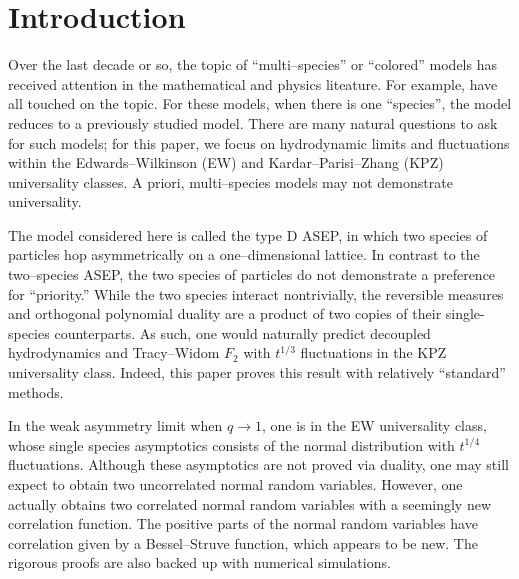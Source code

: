 \documentclass[11pt]{article}
\theoremstyle{plain}
\theoremstyle{definition}
\theoremstyle{remark}
\begin{document}
{\small\tableofcontents}

\section{Introduction}\label{sec:intro}

Over the last decade or so, the topic of ``multi--species'' or ``colored'' models has received attention in the mathematical and physics liteature. For example,    \cite{Spohn14, FSS, PSSS, SpohnStoltz, PSS, MendlSpohn, vanBeijeren, DDSMS, SpohnReview, FunakiHoshino, KupiainenMarcozzi, ButelmannMF,
  CdGHSU, NejjarMixing, FerrariNejjar, NejjarHard, ACH, BalazsSeppalainen, FerrariMartin, ANP, BorodinWheeler, AggarwalBorodin, FerrariKipnis,
  CasiniGR, FKZ, CGMO, KuanZhou, GroeneveltWagenaar, Wagenaar, AyalaZimmer, DaCunhaSasada, CCGO, CasiniFG, dNBD, Doyon, DPSY, DEHP,
  CorteelWilliams, CdGW, KMO, Martin, RDKKS, SKP, WCS} have all touched on the topic. For these models, when there is one ``species'', the model reduces to a previously studied model. There are many natural questions to ask for such models; for this paper, we focus on hydrodynamic limits and fluctuations within the Edwards--Wilkinson (EW) and Kardar--Parisi--Zhang (KPZ) universality classes. A priori, multi--species models may not demonstrate universality. 
  
  The model considered here is called the type D ASEP, in which two species of particles hop asymmetrically on a one--dimensional lattice. In contrast to the two--species ASEP, the two species of particles do not demonstrate a preference for ``priority.'' While the two species interact nontrivially, the reversible measures and orthogonal polynomial duality are a product of two copies of their single-species counterparts.  As such, one would naturally predict decoupled hydrodynamics and Tracy--Widom $F_2$ with $t^{1/3}$ fluctuations in the KPZ universality class. Indeed, this paper proves this result with relatively ``standard'' methods. 
  
 In the weak asymmetry limit when $q\rightarrow 1$, one is in the EW universality class, whose single species asymptotics consists of the normal distribution with $t^{1/4}$ fluctuations. Although these asymptotics are not proved via duality, one may still expect to obtain two uncorrelated normal random variables. However, one actually obtains two correlated normal random variables with a seemingly new correlation function. The positive parts of the normal random variables have correlation given by a Bessel--Struve function, which appears to be new. The rigorous proofs are also backed up with numerical simulations.
  
\end{document}
